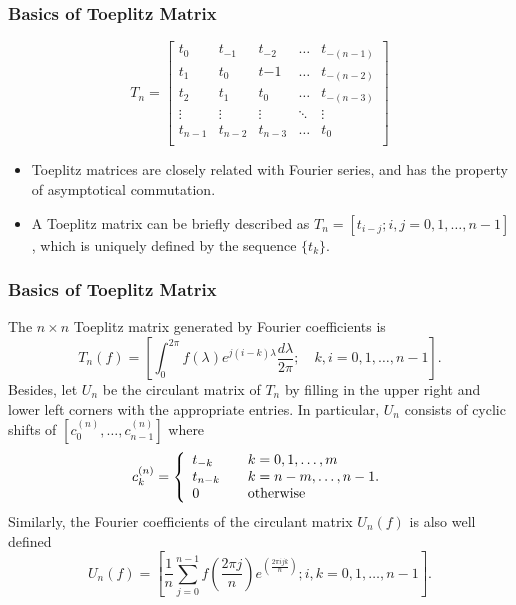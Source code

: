 \documentclass{beamer}
\begin{document}
\begin{frame}
\frametitle{Basics of Toeplitz Matrix}
\begin{equation}
   T_n = \begin{bmatrix}
     t_0 & t_{-1} & t_{-2} & \dots & t_{-(n-1)} \\
     t_1 & t_0 & t{-1} & \dots & t_{-(n-2)} \\
     t_2 & t_1 & t_0 & \dots & t_{-(n-3)} \\
     \vdots & \vdots& \vdots & \ddots & \vdots \\
     t_{n-1} & t_{n-2} & t_{n-3} & \dots & t_0 \\
     \end{bmatrix}
\end{equation}
\begin{itemize}
  \item Toeplitz matrices are closely related with Fourier series, and has the property of asymptotical commutation.
  \item A Toeplitz matrix can be briefly described as $T_n=[t_{i-j};i,j=0,1,\dots,n-1]$, which is uniquely defined by the sequence $\{t_k\}$.
\end{itemize}
\end{frame}

\begin{frame}
\frametitle{Basics of Toeplitz Matrix}
The $n\times n$ Toeplitz matrix generated by Fourier coefficients is
\begin{equation}
  T_n(f)=\left[\int_0^{2\pi}f(\lambda)e^{j(i-k)\lambda}\frac{d\lambda}{2\pi};\quad k,i=0,1,\dots,n-1\right].
\end{equation}
Besides, let $U_n$ be the circulant matrix of $T_n$ by filling in the upper right and lower left corners with the appropriate entries. In particular, $U_n$ consists of cyclic shifts of $[c_0^{(n)},\dots,c_{n-1}^{(n)}]$ where
  \begin{equation}
    c_k^{(n)}=\left\{ 
      \begin{array}{l l}
        t_{-k} & \quad k=0,1,\dots,m \\
        t_{n-k} & \quad k=n-m,\dots,n-1. \\
        0 & \quad \text{otherwise} \\
      \end{array} \right.
  \end{equation}
Similarly, the Fourier coefficients of the circulant matrix $U_n(f)$ is also well defined
\begin{equation}
  \label{fourier_circulant}
  U_n(f) = \left[\frac{1}{n}\sum_{j=0}^{n-1}f\left(\frac{2\pi j}{n}\right)e^{\left(\frac{2\pi ijk}{n}\right)};i,k=0,1,\dots,n-1\right].
\end{equation}

\end{frame}
\end{document}
